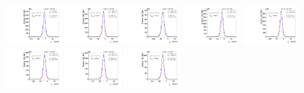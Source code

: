 \begin{figure}[htb]
\includegraphics[width=0.19\textwidth]{plots/Appendix_Recoil_Fits/WmpMC_PF_13TeV_2G/pfu1fit_8.pdf}
\includegraphics[width=0.19\textwidth]{plots/Appendix_Recoil_Fits/WmpMC_PF_13TeV_2G/pfu1fit_9.pdf}
\includegraphics[width=0.19\textwidth]{plots/Appendix_Recoil_Fits/WmpMC_PF_13TeV_2G/pfu1fit_19.pdf}
\includegraphics[width=0.19\textwidth]{plots/Appendix_Recoil_Fits/WmpMC_PF_13TeV_2G/pfu1fit_11.pdf}
\includegraphics[width=0.19\textwidth]{plots/Appendix_Recoil_Fits/WmpMC_PF_13TeV_2G/pfu1fit_12.pdf}
\includegraphics[width=0.19\textwidth]{plots/Appendix_Recoil_Fits/WmpMC_PF_13TeV_2G/pfu1fit_13.pdf}
\includegraphics[width=0.19\textwidth]{plots/Appendix_Recoil_Fits/WmpMC_PF_13TeV_2G/pfu1fit_14.pdf}
\includegraphics[width=0.19\textwidth]{plots/Appendix_Recoil_Fits/WmpMC_PF_13TeV_2G/pfu1fit_15.pdf}

\end{figure}
